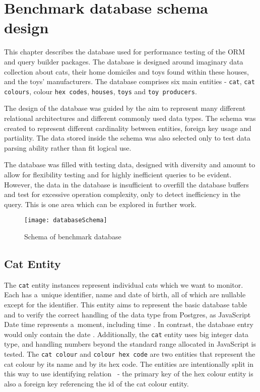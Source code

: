 \chapter{Benchmark database schema design}\label{ch:database}

This chapter describes the database used for performance testing of the ORM and
query builder packages. The database is designed around imaginary data
collection about cats, their home domiciles and toys found within these houses,
and the toys' manufacturers. The database comprises six main entities -
\texttt{cat}, \texttt{cat colours}, colour \texttt{hex codes}, \texttt{houses},
\texttt{toys} and \texttt{toy producers}.

The design of the database was guided by the aim to represent many different
relational architectures and different commonly used data types. The schema was
created to represent different cardinality between entities, foreign key usage
and partiality. The data stored inside the schema was also selected only to test
data parsing ability rather than fit logical use.

The database was filled with testing data, designed with diversity and amount to
allow for flexibility testing and for highly inefficient queries to be evident.
However, the data in the database is insufficient to overfill the database
buffers and test for excessive operation complexity, only to detect inefficiency
in the query. This is one area which can be explored in further work.

\begin{figure}[b]
    \centering
    \texttt{[image: databaseSchema]}
    \caption{Schema of benchmark database}
\end{figure}

\section{Cat Entity}
The \texttt{cat} entity instances represent individual cats which we want to
monitor. Each has a~unique identifier, name and date of birth, all of which are
nullable except for the identifier. This entity aims to represent the basic
database table and to verify the correct handling of the data type from
Postgres, as JavaScript Date time represents a~moment, including time
\cite{JavaScript-Date-MDN}. In contrast, the database entry would only contain
the date \cite{Date/TimeTypes_Postgres}. Additionally, the \texttt{cat} entity
uses big integer data type, and handling numbers beyond the standard range
allocated in JavaScript is tested. The \texttt{cat colour} and \texttt{colour
hex code} are two entities that represent the cat colour by its name and by its
hex code. The entities are intentionally split in this way to use identifying
relation~\cite{Karwin_2010} - the primary key of the hex colour entity is also a
foreign key referencing the id of the cat colour entity.

